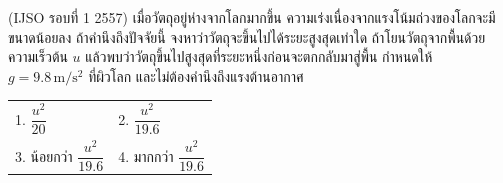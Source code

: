 (IJSO รอบที่ 1 2557) เมื่อวัตถุอยู่ห่างจากโลกมากขึ้น ความเร่งเนื่องจากแรงโน้มถ่วงของโลกจะมีขนาดน้อยลง ถ้าคำนึงถึงปัจจัยนี้ จงหาว่าวัตถุจะขึ้นไปได้ระยะสูงสุดเท่าใด ถ้าโยนวัตถุจากพื้นด้วยความเร็วต้น $u$ แล้วพบว่าวัตถุขึ้นไปสูงสุดที่ระยะหนึ่งก่อนจะตกกลับมาสู่พื้น กำหนดให้ $g=9.8\,\mathrm{m/s^2}$ ที่ผิวโลก และไม่ต้องคำนึงถึงแรงต้านอากาศ
\par\smallskip\par\smallskip\begin{tabular}{@{}p{.48\linewidth}p{.48\linewidth}@{}}1. $\dfrac{u^2}{20}$ & 2. $\dfrac{u^2}{19.6}$ \\ 3. น้อยกว่า $\dfrac{u^2}{19.6}$ & 4. มากกว่า $\dfrac{u^2}{19.6}$\end{tabular}
